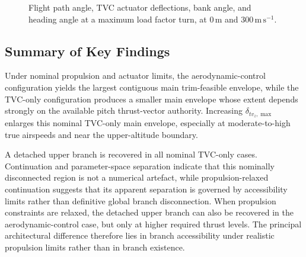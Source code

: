 \documentclass[conf]{new-aiaa}
\begin{document}
\begin{figure}[!h]
\centering
{}
\caption{Flight path angle, TVC actuator deflections, bank angle, and heading angle at a maximum load factor turn, at $0\,\mathrm{m}$ and $300\,\mathrm{m\,s}^{-1}$.}
\label{fig:turn_tvc_phi_psi_case_maxn}
\end{figure}

\subsection{Summary of Key Findings}
Under nominal propulsion and actuator limits, the aerodynamic-control configuration yields the largest contiguous main trim-feasible envelope, while the TVC-only configuration produces a smaller main envelope whose extent depends strongly on the available pitch thrust-vector authority. Increasing $\delta_{tv_z,\max}$ enlarges this nominal TVC-only main envelope, especially at moderate-to-high true airspeeds and near the upper-altitude boundary.

A detached upper branch is recovered in all nominal TVC-only cases. Continuation and parameter-space separation indicate that this nominally disconnected region is not a numerical artefact, while propulsion-relaxed continuation suggests that its apparent separation is governed by accessibility limits rather than definitive global branch disconnection. When propulsion constraints are relaxed, the detached upper branch can also be recovered in the aerodynamic-control case, but only at higher required thrust levels. The principal architectural difference therefore lies in branch accessibility under realistic propulsion limits rather than in branch existence.
\end{document}
